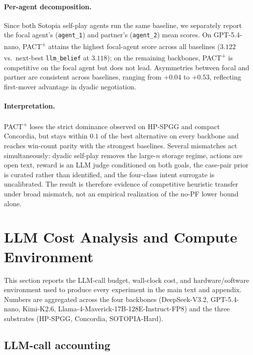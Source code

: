 \paragraph{Per-agent decomposition.} Since both Sotopia self-play agents run the same baseline, we separately report the focal agent's (\texttt{agent\_1}) and partner's (\texttt{agent\_2}) mean scores. On GPT-5.4-nano, PACT\textsuperscript{+} attains the highest focal-agent score across all baselines ($3.122$ vs.\ next-best \texttt{llm\_belief} at $3.118$); on the remaining backbones, PACT\textsuperscript{+} is competitive on the focal agent but does not lead. Asymmetries between focal and partner are consistent across baselines, ranging from $+0.04$ to $+0.53$, reflecting first-mover advantage in dyadic negotiation.

\paragraph{Interpretation.} PACT\textsuperscript{+} loses the strict dominance observed on HP-SPGG and compact Concordia, but stays within $0.1$ of the best alternative on every backbone and reaches win-count parity with the strongest baselines. Several mismatches act simultaneously: dyadic self-play removes the large-$n$ storage regime, actions are open text, reward is an LLM judge conditioned on both goals, the case-pair prior is curated rather than identified, and the four-class intent surrogate is uncalibrated. The result is therefore evidence of competitive heuristic transfer under broad mismatch, not an empirical realization of the no-PF lower bound alone.


\section{LLM Cost Analysis and Compute Environment}
\label{app:cost-compute}

This section reports the LLM-call budget, wall-clock cost, and hardware/software environment used to produce every experiment in the main text and appendix. Numbers are aggregated across the four backbones (DeepSeek-V3.2, GPT-5.4-nano, Kimi-K2.6, Llama-4-Maverick-17B-128E-Instruct-FP8) and the three substrates (HP-SPGG, Concordia, SOTOPIA-Hard).

\subsection{LLM-call accounting}
\label{app:cost-accounting}

